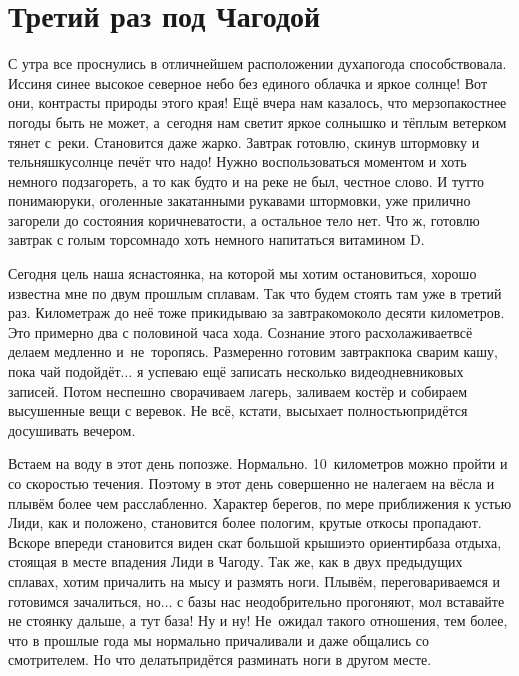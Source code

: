 \chapter{Третий раз под Чагодой} 

С утра все проснулись в отличнейшем расположении духа\mdash погода способствовала. Иссиня синее высокое северное небо без единого облачка и яркое солнце! Вот они, контрасты природы этого края! Ещё вчера нам казалось, что мерзопакостнее погоды быть не может, а~сегодня нам светит яркое солнышко и тёплым ветерком тянет с~реки. Становится даже жарко. Завтрак готовлю, скинув штормовку и тельняшку\mdash солнце печёт что надо! Нужно воспользоваться моментом и хоть немного подзагореть, а то как будто и на реке не был, честное слово. И тут\sdash то понимаю\mdash руки, оголенные закатанными рукавами штормовки, уже прилично загорели до состояния коричневатости, а остальное тело нет. Что ж, готовлю завтрак с голым торсом\mdash надо хоть немного напитаться витамином D.

Сегодня цель наша ясна\mdash стоянка, на которой мы хотим остановиться, хорошо известна мне по двум прошлым сплавам. Так что будем стоять там уже в третий раз. Километраж до неё тоже прикидываю за завтраком\mdash около десяти километров. Это примерно два с половиной часа хода. Сознание этого расхолаживает\mdash всё делаем медленно и~не~торопясь. Размеренно готовим завтрак\mdash пока сварим кашу, пока чай подойдёт$\ldots$ я успеваю ещё записать несколько видеодневниковых записей. Потом неспешно сворачиваем лагерь, заливаем костёр и собираем высушенные вещи с веревок. Не всё, кстати, высыхает полностью\mdash придётся досушивать вечером.

Встаем на воду в этот день попозже. Нормально. 10~километров можно пройти и со скоростью течения. Поэтому в этот день совершенно не налегаем на вёсла и плывём более чем расслабленно. Характер берегов, по мере приближения к устью Лиди, как и положено, становится более пологим, крутые откосы пропадают. Вскоре впереди становится виден скат большой крыши\mdash это ориентир\mdash база отдыха, стоящая в месте впадения Лиди в Чагоду. Так же, как в двух предыдущих сплавах, хотим причалить на мысу и размять ноги. Плывём, переговариваемся и готовимся зачалиться, но$\ldots$ с базы нас неодобрительно прогоняют, мол вставайте не стоянку дальше, а тут база! Ну и ну! Не~ожидал такого отношения, тем более, что в прошлые года мы нормально причаливали и даже общались со смотрителем. Но что делать\mdash придётся разминать ноги в другом месте. 

